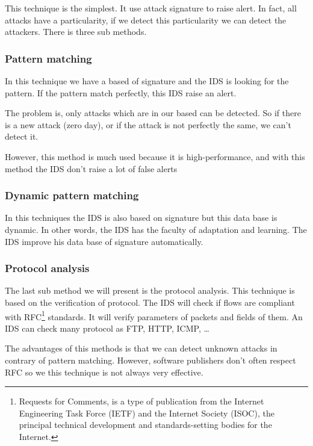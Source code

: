 This technique is the simplest. It use attack signature to raise alert. In fact,
all attacks have a particularity, if we detect this particularity we can detect
the attackers. There is three sub methods.

\subsubsection{Pattern matching}

In this technique we have a based of signature and the IDS is looking for the
pattern. If the pattern match perfectly, this IDS raise an alert.

The problem is, only attacks which are in our based can be detected. So if there
is a new attack (zero day), or if the attack is not perfectly the same, we can't
detect it.

However, this method is much used because it is high-performance, and with this
method the IDS don't raise a lot of false alerts

\subsubsection{Dynamic pattern matching}

In this techniques the IDS is also based on signature but this data base is
dynamic. In other words, the IDS has the faculty of adaptation and learning. The
IDS improve his data base of signature automatically.

\subsubsection{Protocol analysis}

The last sub method we will present is the protocol analysis. This technique is
based on the verification of protocol. The IDS will check if flows are compliant
with RFC\footnote{Requests for Comments, is a type of publication from the
  Internet Engineering Task Force (IETF) and the Internet Society (ISOC), the
  principal technical development and standards-setting bodies for the
  Internet.} standards. It will verify parameters of packets and fields of them.
An IDS can check many protocol as FTP, HTTP, ICMP, \dots

The advantages of this methods is that we can detect unknown attacks in contrary
of pattern matching. However, software publishers don't often respect RFC so we
this technique is not always very effective.





